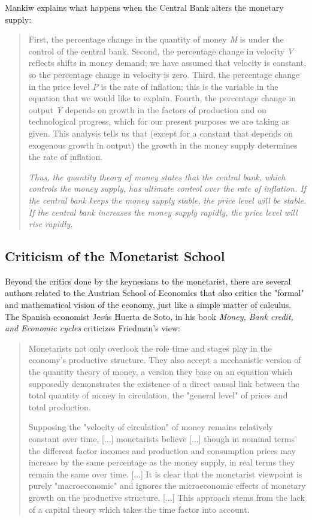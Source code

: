 \documentclass[12pt,a4paper,twoside]{book}
\begin{document}
Mankiw explains what happens when the Central Bank alters the monetary supply:

\begin{quotation}
First, the percentage change in the quantity of money \textit{M} is under the control of the central bank. Second, the percentage change in velocity \textit{V} reflects shifts in money demand; we have assumed that velocity is constant, so the percentage change in velocity is zero. Third, the percentage change in the price level \textit{P} is the rate of inflation; this is the variable in the equation that we would like to explain. Fourth, the percentage change in output \textit{Y} depends on growth in the factors of production and on technological progress, which for our present purposes we are taking as given. This analysis tells us that (except for a constant that depends on exogenous growth in output) the growth in the money supply determines the rate of inflation.

\textit{Thus, the quantity theory of money states that the central bank, which controls the money supply, has ultimate control over the rate of inflation. If the central bank keeps the money supply stable, the price level will be stable. If the central bank increases the money supply rapidly, the price level will rise rapidly.} \cite[p. 90]{mankiw}
\end{quotation}

\subsection{Criticism of the Monetarist School}
Beyond the critics done by the keynesians to the monetarist, there are several authors related to the Austrian School of Economics that also critics the "formal" and mathematical vision of the economy, just like a simple matter of calculus. The Spanish economist Jesús Huerta de Soto, in his book \textit{Money, Bank credit, and Economic cycles} criticizes Friedman's view:

\begin{quotation}
Monetarists not only overlook the role time and stages play in the economy’s productive structure. They also accept a mechanistic version of the quantity theory of money, a version they base on an equation which supposedly demonstrates the existence of a direct causal link between the total quantity of money in circulation, the "general level" of prices and total production.	

Supposing the "velocity of circulation" of money remains relatively constant over time, [...] monetarists believe [...] though in nominal terms the different factor incomes and production and consumption prices may increase by the same percentage as the money supply, in real terms they remain the same over time. [...] It is clear that the monetarist viewpoint is purely "macroeconomic" and ignores the microeconomic effects of monetary growth on the productive structure. [...] This approach stems from the lack of a capital theory which takes the time factor into account. \cite[pp. 522-523]{huertasoto:money}
\end{quotation}
\end{document}
